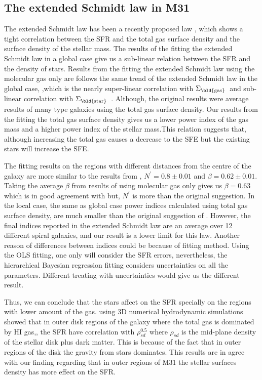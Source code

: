 \documentclass[useAMS,usenatbib]{mn2e}
\newcommand \sigmagas    {$\Sigma_{\rm \bld {gas }} $\ }
\newcommand \sigmastar    {$\Sigma_{\rm \bld {star }} $\ }
\newcommand \eqnprime {N^\prime}
\begin{document}
\subsection{The extended Schmidt law in M31}
\label{sec:es_res}
The extended Schmidt law has been a recently proposed law \citep{Shi11}, which shows a tight correlation between the SFR and the total gas surface density and the surface density of the stellar mass. The results of the fitting the extended Schmidt law in a global case give us a sub-linear relation between the SFR and the density of stars. Results from the fitting the extended Schmidt law using the molecular gas only are %
follows the same trend of the extended Schmidt law in the global case,%
,which is the nearly super-linear correlation with \sigmagas and sub-linear correlation with \sigmastar. Although, the original results were average results of many type galaxies using the total gas surface density. Our results from the fitting the total gas surface density gives us a lower power index of the gas mass and a higher power index of the stellar mass.This relation suggests that, although increasing the total gas causes a decrease to the SFE but the existing stars will increase the SFE. 

 The fitting results on the regions with different distances from the centre of the galaxy are more similar to the results from \cite{Shi11}, $\eqnprime = 0.8 \pm 0.01$ and $\beta = 0.62\pm0.01$. Taking the average $\beta$  from results of using molecular gas only gives us $\beta = 0.63$ which is in good agreement with \cite{Shi11} but, $\eqnprime$ is more than the original suggestion. In the local case, the same as global case power indices calculated using total gas surface density, are much smaller than the original suggestion of \cite{Shi11}. However, the final indices reported in the extended Schmidt law are an average over 12 different spiral galaxies, and our result is a lower limit for this law. 
 Another reason of differences between indices could be because of fitting method. Using the OLS fitting, one only will consider the SFR errors, nevertheless, the hierarchical Bayesian regression fitting considers uncertainties on all the parameters. Different treating with uncertainties would give us the different result.
 

 Thus, we can conclude that the stars affect on the SFR specially on the regions with lower amount of the gas. \cite{Kim13} using 3D numerical hydrodynamic simulations showed that in outer disk regions of the galaxy  where the total gas is dominated by HI gas,, the SFR have correlation with $\rho_{sd}^{0.5}$ where $\rho_{sd}$ is the mid-plane density of the stellar disk plus dark matter. This is because of the fact that in outer regions of the disk the gravity from stars dominates. This results are in agree with our finding regarding that in outer regions of M31 the stellar surfaces density has more effect on the SFR.
\end{document}
